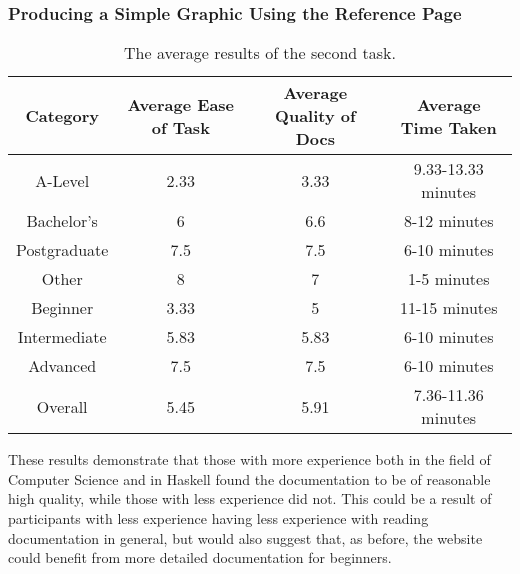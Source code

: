 \documentclass[../main.tex]{subfiles}
\begin{document}
            \subsubsection{Producing a Simple Graphic Using the Reference Page}
                \begin{table}[H]
                    \centering
                    \begin{tabular}{c|c|c|c}
                        \textbf{Category} & \textbf{Average Ease of Task} & \textbf{Average Quality of Docs} & \textbf{Average Time Taken} \\
                        \hline
                        A-Level           & 2.33                          & 3.33                             & 9.33-13.33 minutes          \\
                        Bachelor's        & 6                             & 6.6                              & 8-12 minutes                \\
                        Postgraduate      & 7.5                           & 7.5                              & 6-10 minutes                \\
                        Other             & 8                             & 7                                & 1-5 minutes                 \\
                        \hline
                        Beginner          & 3.33                          & 5                                & 11-15 minutes               \\
                        Intermediate      & 5.83                          & 5.83                             & 6-10 minutes                \\
                        Advanced          & 7.5                           & 7.5                              & 6-10 minutes                \\
                        \hline
                        Overall           & 5.45                          & 5.91                             & 7.36-11.36 minutes          \\
                    \end{tabular}
                    \caption{The average results of the second task.}
                \end{table}

                These results demonstrate that those with more experience both in the field of
                    Computer Science and in Haskell found the documentation to be of reasonable
                    high quality, while those with less experience did not.
                This could be a result of participants with less experience having less
                    experience with reading documentation in general, but would also suggest that,
                    as before, the website could benefit from more detailed documentation for
                    beginners.
\end{document}
